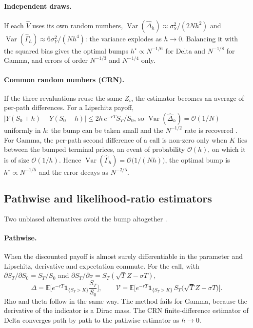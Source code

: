 \documentclass[11pt,a4paper]{article}
\newcommand{\E}{\mathbb{E}}
\newcommand{\Var}{\operatorname{Var}}
\newcommand{\1}{\mathbf{1}}
\theoremstyle{plain}
\theoremstyle{remark}
\begin{document}
\paragraph{Independent draws.}
If each $\hat V$ uses its own random numbers, $\Var(\hat\Delta_h) \approx \sigma_Y^2/(2Nh^2)$ and
$\Var(\hat\Gamma_h) \approx 6\sigma_Y^2/(Nh^4)$: the variance explodes as $h \to 0$. Balancing it with the squared
bias gives the optimal bumps $h^\star \propto N^{-1/6}$ for Delta and $N^{-1/8}$ for Gamma, and errors of order
$N^{-1/3}$ and $N^{-1/4}$ only.

\paragraph{Common random numbers (CRN).}
If the three revaluations reuse the same $Z_i$, the estimator becomes an average of per-path differences. For a
Lipschitz payoff, $|Y(S_0+h) - Y(S_0-h)| \le 2h\, e^{-rT} S_T/S_0$, so $\Var(\hat\Delta_h) = \mathcal{O}(1/N)$
uniformly in $h$: the bump can be taken small and the $N^{-1/2}$ rate is recovered \citep[\S 7.1]{glasserman2003}.
For Gamma, the per-path second difference of a call is non-zero only when $K$ lies between the bumped terminal
prices, an event of probability $\mathcal{O}(h)$, on which it is of size $\mathcal{O}(1/h)$. Hence
$\Var(\hat\Gamma_h) = \mathcal{O}\big(1/(Nh)\big)$, the optimal bump is $h^\star \propto N^{-1/5}$ and the error
decays as $N^{-2/5}$.

\subsection{Pathwise and likelihood-ratio estimators}

Two unbiased alternatives avoid the bump altogether \citep{broadie1996}.

\paragraph{Pathwise.} When the discounted payoff is almost surely differentiable in the parameter and Lipschitz,
derivative and expectation commute. For the call, with $\partial S_T/\partial S_0 = S_T/S_0$ and
$\partial S_T/\partial\sigma = S_T(\sqrt{T}Z - \sigma T)$,
\begin{equation}
  \Delta = \E\Big[e^{-rT}\1_{\{S_T > K\}} \frac{S_T}{S_0}\Big], \qquad
  \mathcal{V} = \E\Big[e^{-rT}\1_{\{S_T > K\}}\, S_T\big(\sqrt{T}Z - \sigma T\big)\Big].
\end{equation}
Rho and theta follow in the same way. The method fails for Gamma, because the derivative of the indicator is a
Dirac mass. The CRN finite-difference estimator of Delta converges path by path to the pathwise estimator as
$h \to 0$.
\end{document}
